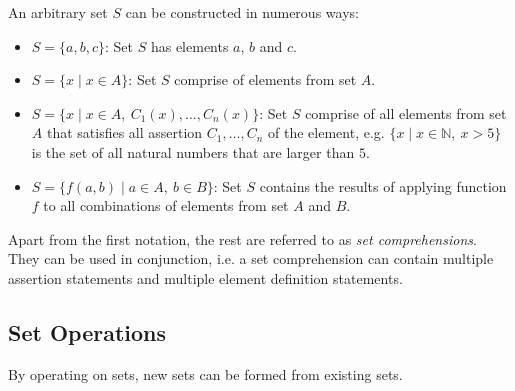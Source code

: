 \documentclass[12pt]{article}
\theoremstyle{definition}
\newcommand{\NN}{\mathbb{N}}
\newcommand{\bras}[1]{\lbrace #1 \rbrace}
\begin{document}
	An arbitrary set $S$ can be constructed in numerous ways:
	\begin{itemize}
		\item $S = \bras{a, b, c}$: Set $S$ has elements $a$, $b$ and $c$.
		\item $S = \bras{x \mid x \in A}$: Set $S$ comprise of elements from set $A$.
		\item $S = \bras{x \mid x \in A,\ C_1(x), \dots, C_n(x)}$: Set $S$ comprise of all elements from set $A$ that satisfies all assertion $C_1, \dots, C_n$ of the element, e.g. $\bras{x \mid x \in \NN,\ x > 5}$ is the set of all natural numbers that are larger than $5$.
		\item $S = \bras{f(a, b) \mid a \in A,\ b \in B}$: Set $S$ contains the results of applying function $f$ to all combinations of elements from set $A$ and $B$.
	\end{itemize}
	
	Apart from the first notation, the rest are referred to as \emph{set comprehensions}. They can be used in conjunction, i.e. a set comprehension can contain multiple assertion statements and multiple element definition statements.
	
	\subsection{Set Operations}
	
	By operating on sets, new sets can be formed from existing sets.
	
\end{document}
